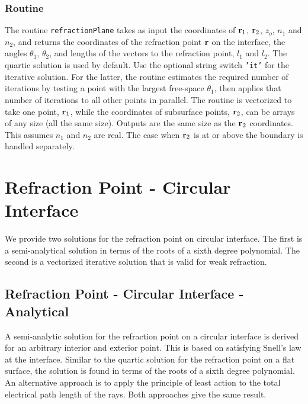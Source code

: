 \subsubsection{Routine}

The routine \texttt{refractionPlane} takes as input the coordinates of $\mathbf{r}_1$, $\mathbf{r}_2$, $z_o$, $n_1$ and $n_2$, and returns the coordinates of the refraction point $\mathbf{r}$ on the interface, the angles $\theta_1$, $\theta_2$, and lengths of the vectors to the refraction point, $l_1$ and $l_2$. The quartic solution is used by default. Use the optional string switch \texttt{'it'} for the iterative solution. For the latter, the routine estimates the required number of iterations by testing a point with the largest free-space $\theta_1$, then applies that number of iterations to all other points in parallel.  The routine is vectorized to take one point, $\mathbf{r}_1$, while the coordinates of subsurface points, $\mathbf{r}_2$, can be arrays of any size (all the same size). Outputs are the same size as the $\mathbf{r}_2$ coordinates. This assumes $n_1$ and $n_2$ are real. The case when $\mathbf{r}_2$ is at or above the boundary is handled separately. 





{\footnotesize
{}
}



\section{Refraction Point - Circular Interface}
We provide two solutions for the refraction point on circular interface. The first is a semi-analytical solution in terms of the roots of a sixth degree polynomial. The second is a vectorized iterative solution that is valid for weak refraction. 



\subsection{Refraction Point - Circular Interface - Analytical}

\label{sec:refractdir}
A semi-analytic solution for the refraction point on a circular interface is derived for an arbitrary interior and exterior point. This is based on satisfying Snell's law at the interface. Similar to the quartic solution for the refraction point on a flat surface, the solution is found in terms of the roots of a sixth degree polynomial. An alternative approach is to apply the principle of least action to the total electrical path length of the rays. Both approaches give the same result.

